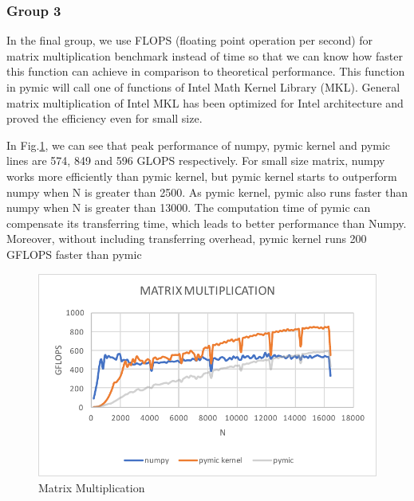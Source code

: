 \subsubsection{Group 3}
In the final group, we use FLOPS (floating point operation per second) for matrix multiplication benchmark instead of time so that we can know how faster this function can achieve in comparison to theoretical performance. This function in pymic will call one of functions of Intel Math Kernel Library (MKL). General matrix multiplication of Intel MKL has been optimized for Intel architecture and proved the efficiency even for small size. 

In Fig.\ref{fig:func-dot}, we can see that peak performance of numpy, pymic kernel and pymic lines are 574, 849 and 596 GLOPS respectively. For small size matrix, numpy works more efficiently than pymic kernel, but pymic kernel starts to outperform numpy when N is greater than 2500. As pymic kernel, pymic also runs faster than numpy when N is greater than 13000. The computation time of pymic can compensate its transferring time, which leads to better performance than Numpy. Moreover, without including transferring overhead, pymic kernel runs 200 GFLOPS faster than pymic

\begin{figure}[]
\centering
\includegraphics[scale=0.7]{img/dot128.pdf}
\caption{Matrix Multiplication}
\label{fig:func-dot}
\end{figure}